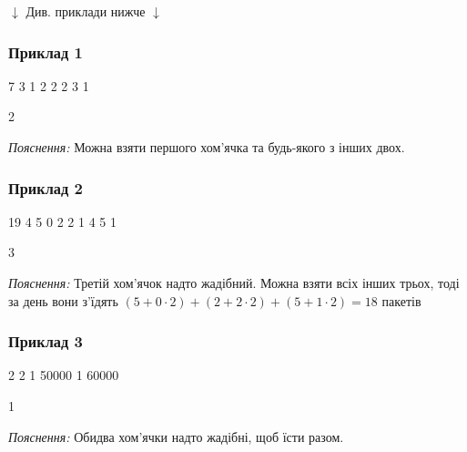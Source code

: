 \documentclass[12pt,a4paper]{article}
\begin{document}
\begin{pagebottomtext}
$\downarrow$ Див. приклади нижче $\downarrow$
\end{pagebottomtext}


\pagebreak


\subsubsection*{Приклад 1}

\textbf{}

\begin{codeblock}
7
3
1 2
2 2
3 1
\end{codeblock}

\textbf{}

\begin{codeblock}
2
\end{codeblock}
\emph{Пояснення:} Можна взяти першого хом’ячка та будь-якого з інших двох.


\subsubsection*{Приклад 2}

\textbf{}

\begin{codeblock}
19
4
5 0
2 2
1 4
5 1
\end{codeblock}

\textbf{}

\begin{codeblock}
3
\end{codeblock}
\emph{Пояснення:} Третій хом’ячок надто жадібний. Можна взяти всіх інших трьох, тоді за день вони з’їдять \((5 + 0 \cdot 2) + (2 + 2 \cdot 2) + (5 + 1 \cdot 2) = 18\) пакетів


\subsubsection*{Приклад 3}

\textbf{}

\begin{codeblock}
2
2
1 50000
1 60000
\end{codeblock}

\textbf{}

\begin{codeblock}
1
\end{codeblock}
\emph{Пояснення:} Обидва хом’ячки надто жадібні, щоб їсти разом.
\end{document}
